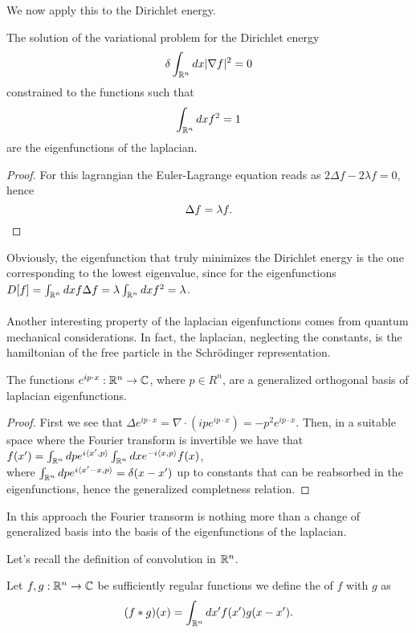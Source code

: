 \documentclass[../2.tex]{subfiles}
\begin{document}
We now apply this to the Dirichlet energy.

\begin{prop}
    The solution of the variational problem for the Dirichlet energy
    \[ \delta\int_{\mathbb{R}^n} dx | \nabla f |^2 = 0 \]
    constrained to the functions such that 
    \[ \int_{\mathbb{R}^n} dx f^2 = 1 \]
    are the eigenfunctions of the laplacian.
\end{prop}
\begin{proof}
    For this lagrangian the Euler-Lagrange equation reads as $ 2 \Delta f - 2\lambda f = 0$,
    hence 
    \[ \Delta f = \lambda f . \qedhere \]

\end{proof}

Obviously, the eigenfunction that truly minimizes the Dirichlet energy is the one corresponding to the lowest eigenvalue,
since for the eigenfunctions $D[f] = \int_{\mathbb{R}^n} dx f \Delta f = \lambda \int_{\mathbb{R}^n} dx f^2 = \lambda$.\\
\hfill \\

Another interesting property of the laplacian eigenfunctions comes from quantum mechanical considerations.
In fact, the laplacian, neglecting the constants, is the hamiltonian of the free particle in the Schr\"{o}dinger representation.

\begin{prop}
    The functions $e^{ip\cdot x} : \mathbb{R}^n \to \mathbb{C}$, where $p \in R^n$, are a generalized orthogonal basis of laplacian eigenfunctions.
\end{prop}
\begin{proof} 
    First we see that $\Delta e^{ip\cdot x} = \nabla \cdot (ipe^{ip\cdot x}) = -p^2 e^{ip\cdot x}$.
    Then, in a suitable space where the Fourier transform is invertible we have that $f(x') = \int_{\mathbb{R}^n} dp e^{i\langle x', p \rangle}\int_{\mathbb{R}^n} dx e^{-i\langle x, p \rangle}f(x)$, 
    \\where $\int_{\mathbb{R}^n} dp e^{i\langle x'-x, p \rangle} = \delta(x-x')$ up to constants that can be reabsorbed in the eigenfunctions, hence the generalized completness relation. \qedhere
\end{proof}

In this approach the Fourier transorm is nothing more than a change of generalized basis into the basis of the eigenfunctions of the laplacian.

Let's recall the definition of convolution in $\mathbb{R}^n$.

\begin{defn}
    Let $f,g : \mathbb{R}^n \to \mathbb{C}$ be sufficiently regular functions we define the  of $f$ with $g$ as
    \[ (f * g)(x) = \int_{\mathbb{R}^n} dx' f(x')g(x-x').\]
\end{defn}
\end{document}
